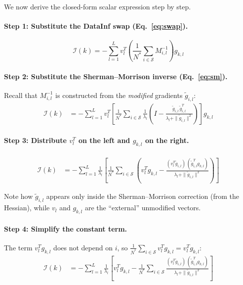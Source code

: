 \documentclass{article}
\begin{document}
We now derive the closed-form scalar expression step by step.

\paragraph{Step 1: Substitute the DataInf swap (Eq.~\eqref{eq:swap}).}
\begin{equation}\label{eq:step1}
    \mathcal{I}(k)
    = -\sum_{l=1}^{L} v_l^T \left(\frac{1}{N^*}\sum_{i\in\mathcal{S}} M_{i,l}^{-1}\right) g_{k,l}
\end{equation}

\paragraph{Step 2: Substitute the Sherman--Morrison inverse (Eq.~\eqref{eq:sm}).}
Recall that $M_{i,l}^{-1}$ is constructed from the \emph{modified} gradients $\tilde{g}_{i,l}$:
\begin{align}
    \mathcal{I}(k)
    &= -\sum_{l=1}^{L} v_l^T
       \left[\frac{1}{N^*}\sum_{i\in\mathcal{S}}
       \frac{1}{\lambda_l}\!\left(I - \frac{\tilde{g}_{i,l}\,\tilde{g}_{i,l}^T}{\lambda_l + \|\tilde{g}_{i,l}\|^2}\right)
       \right] g_{k,l} \label{eq:step2}
\end{align}

\paragraph{Step 3: Distribute $v_l^T$ on the left and $g_{k,l}$ on the right.}
\begin{align}
    \mathcal{I}(k)
    &= -\sum_{l=1}^{L} \frac{1}{\lambda_l}
       \left[
       \frac{1}{N^*}\sum_{i\in\mathcal{S}}
       \left(
           v_l^T g_{k,l}
           - \frac{(v_l^T \tilde{g}_{i,l})\,(\tilde{g}_{i,l}^T g_{k,l})}
                  {\lambda_l + \|\tilde{g}_{i,l}\|^2}
       \right)
       \right] \label{eq:step3}
\end{align}

Note how $\tilde{g}_{i,l}$ appears only inside the Sherman--Morrison correction (from the Hessian), while $v_l$ and $g_{k,l}$ are the ``external'' unmodified vectors.

\paragraph{Step 4: Simplify the constant term.}
The term $v_l^T g_{k,l}$ does not depend on $i$, so $\frac{1}{N^*}\sum_{i\in\mathcal{S}} v_l^T g_{k,l} = v_l^T g_{k,l}$:
\begin{align}
    \mathcal{I}(k)
    &= -\sum_{l=1}^{L} \frac{1}{\lambda_l}
       \left[
           v_l^T g_{k,l}
           - \frac{1}{N^*}\sum_{i\in\mathcal{S}}
             \frac{(v_l^T \tilde{g}_{i,l})\,(\tilde{g}_{i,l}^T g_{k,l})}
                  {\lambda_l + \|\tilde{g}_{i,l}\|^2}
       \right] \label{eq:step4}
\end{align}
\end{document}
